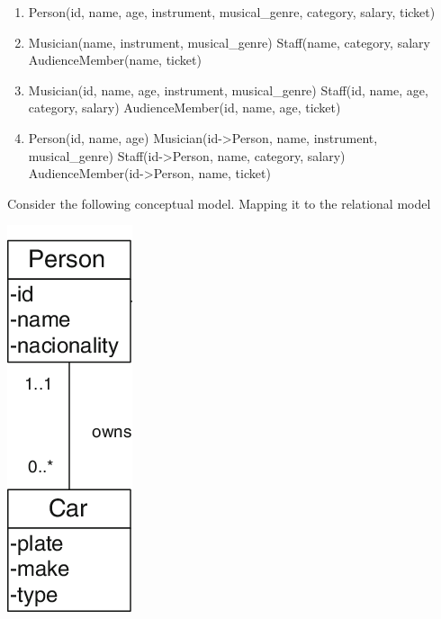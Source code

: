 \documentclass{bdad}
\begin{document}
\begin{enumerate}
    \item \boxedredcross
\begin{blocklisting}
Person(id, name, age, instrument, musical_genre, category, salary, ticket)
\end{blocklisting}
    \item \boxedredcross
\begin{blocklisting}
Musician(name, instrument, musical_genre)
Staff(name, category, salary
AudienceMember(name, ticket)
\end{blocklisting}
    \item \boxedgreencheckmark
\begin{blocklisting}
Musician(id, name, age, instrument, musical_genre)
Staff(id, name, age, category, salary)
AudienceMember(id, name, age, ticket)
\end{blocklisting}
    \item \boxedgreencheckmark
\begin{blocklisting}
Person(id, name, age)
Musician(id->Person, name, instrument, musical_genre)
Staff(id->Person, name, category, salary)
AudienceMember(id->Person, name, ticket)
\end{blocklisting}
\end{enumerate}

\newpage
{}
Consider the following conceptual model. Mapping it to the relational model

\begin{center}
    \includegraphics[scale=0.8]{2020T-08.png}
\end{center}
\end{document}
